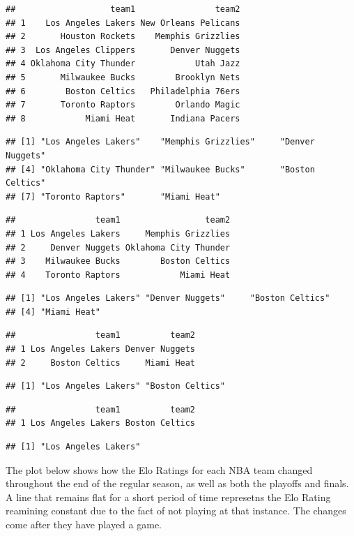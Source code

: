 \documentclass[]{article}
\begin{document}
\begin{verbatim}
##                   team1                team2
## 1    Los Angeles Lakers New Orleans Pelicans
## 2       Houston Rockets    Memphis Grizzlies
## 3  Los Angeles Clippers       Denver Nuggets
## 4 Oklahoma City Thunder            Utah Jazz
## 5       Milwaukee Bucks        Brooklyn Nets
## 6        Boston Celtics   Philadelphia 76ers
## 7       Toronto Raptors        Orlando Magic
## 8            Miami Heat       Indiana Pacers
\end{verbatim}

\begin{verbatim}
## [1] "Los Angeles Lakers"    "Memphis Grizzlies"     "Denver Nuggets"       
## [4] "Oklahoma City Thunder" "Milwaukee Bucks"       "Boston Celtics"       
## [7] "Toronto Raptors"       "Miami Heat"
\end{verbatim}

\begin{verbatim}
##                team1                 team2
## 1 Los Angeles Lakers     Memphis Grizzlies
## 2     Denver Nuggets Oklahoma City Thunder
## 3    Milwaukee Bucks        Boston Celtics
## 4    Toronto Raptors            Miami Heat
\end{verbatim}

\begin{verbatim}
## [1] "Los Angeles Lakers" "Denver Nuggets"     "Boston Celtics"    
## [4] "Miami Heat"
\end{verbatim}

\begin{verbatim}
##                team1          team2
## 1 Los Angeles Lakers Denver Nuggets
## 2     Boston Celtics     Miami Heat
\end{verbatim}

\begin{verbatim}
## [1] "Los Angeles Lakers" "Boston Celtics"
\end{verbatim}

\begin{verbatim}
##                team1          team2
## 1 Los Angeles Lakers Boston Celtics
\end{verbatim}

\begin{verbatim}
## [1] "Los Angeles Lakers"
\end{verbatim}

The plot below shows how the Elo Ratings for each NBA team changed
throughout the end of the regular season, as well as both the playoffs
and finals. A line that remains flat for a short period of time
represetns the Elo Rating reamining constant due to the fact of not
playing at that instance. The changes come after they have played a
game.
\end{document}
